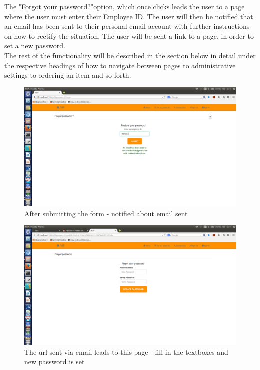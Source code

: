 \documentclass[a4paper,12pt]{article}
\begin{document}
The "Forgot your password?"option, which once clicks leads the user to a page where the user must enter their Employee ID. The user will then be notified that an email has been sent to their personal email account with further instructions on how to rectify the situation. The user will be sent a link to a page, in order to set a new password.    \\

The rest of the functionality will be described in the section below in detail  under the respective headings of how to navigate between pages to administrative settings to ordering an item and so forth. 
 
\begin{figure}[H]
  \centering
    \includegraphics[width=1.0\textwidth]{screenshots/emailSentForPass.png}
    \caption{After submitting the form - notified about email sent} 
\end{figure}

\begin{figure}[H]
  \centering
    \includegraphics[width=1.0\textwidth]{screenshots/newPassForPass.png}
    \caption{The url sent via email leads to this page - fill in the textboxes and new password is set} 
\end{figure}
\end{document}
